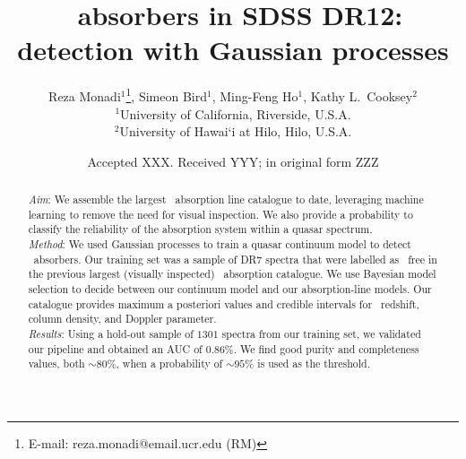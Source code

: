 \documentclass[fleqn,usenatbib]{mnras}
\title[\civ\ absorbers in SDSS DR12]{\civ\ absorbers in SDSS DR12:
 detection with Gaussian processes}
\author[R.~Monadi et. al.]{
Reza Monadi$^{1}$\thanks{E-mail: reza.monadi@email.ucr.edu (RM)},
Simeon Bird$^{1}$, Ming-Feng Ho$^{1}$, Kathy L.~Cooksey$^{2}$
\\
$^{1}$University of California, Riverside, U.S.A.\\
$^{2}$University of Hawai`i at Hilo, Hilo, U.S.A.}
\date{Accepted XXX. Received YYY; in original form ZZZ}
\newcommand{\civ}{\ion{C}{IV}}
\newcommand{\nciv}{N_{\civ}} %
\newcommand{\zciv}{z_{\civ}}
\newcommand{\sciv}{\sigma_{\civ}}
\newcommand{\zqso}{z_{\textrm{QSO}}}
\begin{document}
\label{firstpage}
\pagerange{\pageref{firstpage}--\pageref{lastpage}}
\maketitle

\begin{abstract}
  \emph{Aim}:  We assemble the largest \civ\ absorption line catalogue to date,
  leveraging %
  machine learning to remove the need for visual inspection. We also provide a probability to classify the reliability of the absorption system within a quasar spectrum.  \\
  \emph{Method}: We  used Gaussian processes to train a quasar
  continuum model to detect \civ~absorbers.
  Our training set was a sample of DR7
  spectra that %
  were labelled as \civ~free in the previous largest (visually inspected)
  \civ\ absorption catalogue.
  We use Bayesian model selection to decide between our continuum
  model and our absorption-line models. %
  Our catalogue provides maximum a posteriori values and credible intervals
  for \civ\ redshift, column density, and Doppler parameter. %
  \\ %
  \emph{Results}: Using a hold-out sample of $1301$
spectra from our training set, we validated our pipeline and obtained
an AUC %
of 0.86\%.
We find good purity and completeness values, both $\sim 80\%$, when a probability of $\sim95\%$ is used as the threshold.

\end{abstract}
\end{document}
